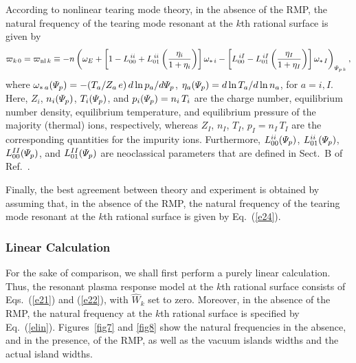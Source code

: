 \documentclass[12pt,prb,aps]{revtex4-1}
\begin{document}
According to nonlinear tearing mode theory, in the absence of the RMP, 
the natural frequency of the tearing mode resonant at the $k$th rational surface is given by\,\cite{rftor}
\begin{equation}
\varpi_{k\,0} = \varpi_{{\rm nl}\,k}\equiv  -n\left(\omega_E +\left[1-L_{00}^{\,ii}+L_{01}^{\,ii}\left(\frac{\eta_i}{1+\eta_i}\right)\right]
\omega_{\ast\,i}
-\left[L_{00}^{\,iI}- L_{01}^{\,iI}\left(\frac{\eta_I}{1+\eta_I}\right)\right]\omega_{\ast\,I}\right)_{{\mit\Psi}_{p\,k}},
\end{equation}
where
$\omega_{\ast\,a}({\mit\Psi}_p) =-(T_a/Z_a\,e)\,d\ln p_a/d{\mit\Psi}_p$,
$\eta_a({\mit\Psi}_p)=d\ln T_a/d\ln n_a$,
for $a=i, I$. 
Here, $Z_i$, $n_i({\mit\Psi}_p)$, $T_i({\mit\Psi}_p)$, and $p_i({\mit\Psi}_p)=n_i\,T_i$   are the charge number, 
equilibrium number density, 
equilibrium temperature, and equilibrium pressure
of the majority (thermal) ions, respectively,
whereas  $Z_I$, $n_I$, $T_I$, $p_I = n_I\,T_I$
are the corresponding quantities for the impurity ions.  
Furthermore, $L_{00}^{ii}({\mit\Psi}_p)$, $L_{01}^{ii}({\mit\Psi}_p)$,  $L_{00}^{II}({\mit\Psi}_p)$, and $L_{01}^{II}({\mit\Psi}_p)$ are neoclassical parameters that are defined
in Sect.~B of Ref.~. 

Finally, the best agreement between theory and experiment is obtained by assuming that, in the absence of the RMP, the 
 natural frequency of the tearing mode resonant at the $k$th rational surface is given by Eq.~(\ref{e24}).\cite{rftor1,heyn}
 
\subsubsection{Linear Calculation}
For the sake of comparison, we shall first perform a purely linear calculation. Thus, the
resonant plasma response model at the $k$th rational surface consists of Eqs.~(\ref{e21}) and (\ref{e22}), with
$\hat{W}_k$ set to zero. Moreover, in the absence of the RMP, the natural frequency at the $k$th rational surface is specified by Eq.~(\ref{elin}).
Figures~\ref{fig7} and \ref{fig8} show the natural frequencies in the absence, and in the presence, of the RMP, as well as the vacuum
islands widths and the actual island widths. 
\end{document}
